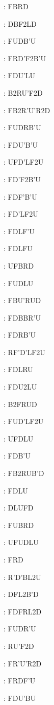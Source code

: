 \documentclass[9pt]{article}
\begin{document}
{\begin{multicols}{6}
: FBRD

: DBF2LD

: FUDB'U

: FRD'F2B'U

: FDU'LU

: B2RU'F2D

: FB2R'U'R2D

: FUDRB'U

: FDU'B'U

: UFD'LF2U

: FD'F2B'U

: FDF'B'U

: FD'LF2U

: FDLF'U

: FDLFU

: UFBRD

: FUDLU

: FBU'RUD

: FDBBR'U

: FDRB'U

: RF'D'LF2U

: FDLRU

: FDU2LU

: B2FRUD

: FUD'LF2U

: UFDLU

: FDB'U

: FB2RUB'D

: FDLU

: DLUFD

: FUBRD

: UFUDLU

: FRD

: R'D'BL2U

: DFL2B'D

: FDFRL2D

: FUDR'U

: RU'F2D

: FR'U'R2D

: FRDF'U

: FDU'BU


\end{multicols}}
\end{document}
